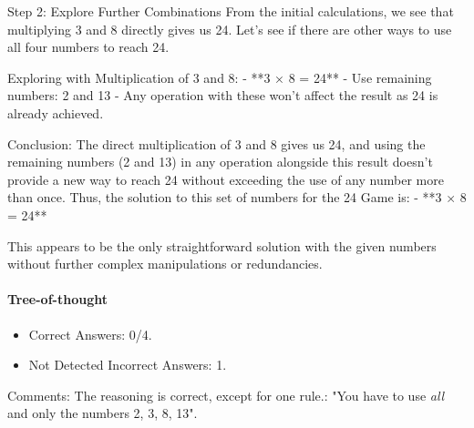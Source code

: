 \begin{dialogue}
\begin{small}
\begin{spverbatim}
 Step 2: Explore Further Combinations
From the initial calculations, we see that multiplying 3 and 8 directly gives us 24. Let's see if there are other ways to use all four numbers to reach 24.

 Exploring with Multiplication of 3 and 8:
- **3 × 8 = 24**
- Use remaining numbers: 2 and 13
- Any operation with these won't affect the result as 24 is already achieved.

 Conclusion:
The direct multiplication of 3 and 8 gives us 24, and using the remaining numbers (2 and 13) in any operation alongside this result doesn't provide a new way to reach 24 without exceeding the use of any number more than once. Thus, the solution to this set of numbers for the 24 Game is:
- **3 × 8 = 24**

This appears to be the only straightforward solution with the given numbers without further complex manipulations or redundancies.
\end{spverbatim}\end{small}
\end{dialogue}

\paragraph{Tree-of-thought}
\begin{itemize}
    \item Correct Answers: 0/4.
    \item Not Detected Incorrect Answers: 1.
\end{itemize}
Comments: The reasoning is correct, except for one rule.: "You have to use \emph{all} and only the numbers 2, 3, 8, 13". 

